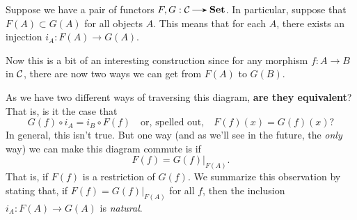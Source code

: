     \begin{example}
        Suppose we have a pair of functors $F, G: \cc \to \Set$. 
        In particular, suppose that $F(A) \subset G(A)$ for all objects $A$. 
        This means that for each $A$, there exists an injection $i_A: F(A) \to G(A)$.
        
        Now this is a bit of an interesting construction since for any morphism 
        $f: A \to B$ in $\mathcal{C}$, there are now two ways we can get from $F(A)$ 
        to $G(B)$. 
        \begin{center}
            \hspace{1cm}
            \hspace{1cm}
        \end{center}

        As we have two different ways of traversing this diagram, \textbf{are they equivalent}? 
        That is, is it the case that 
        \[
            G(f) \circ i_A = i_B \circ F(f)
            \quad \text{or, spelled out,} \quad     
            F(f)(x) = G(f)(x)?
        \]
        In general, this isn't true. But one way 
        (and as we'll see in the future, the \emph{only} way) 
        we can make this diagram commute is if
        \[
            F(f) = G(f)\big|_{F(A)}.
        \]
        That is, if $F(f)$ is a restriction of $G(f)$. We summarize this 
        observation by stating that, if $F(f) = G(f)\big|_{F(A)}$ for all $f$, 
        then the inclusion $i_A: F(A) \to G(A)$ is \emph{natural}.
    \end{example}

